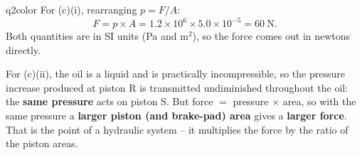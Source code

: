 \documentclass[11pt,a4paper]{article}
\begin{document}
\begin{ansbox}{q2color}
For (c)(i), rearranging $p = F/A$:
\[ F = p \times A = 1.2 \times 10^{6} \times 5.0 \times 10^{-5} = 60\ \mathrm{N}. \]
Both quantities are in SI units (Pa and $\mathrm{m^2}$), so the force comes out in newtons directly.

For (c)(ii), the oil is a liquid and is practically incompressible, so the pressure increase produced at piston R is transmitted undiminished throughout the oil: the \textbf{same pressure} acts on piston S. But force $= $ pressure $\times$ area, so with the same pressure a \textbf{larger piston (and brake-pad) area} gives a \textbf{larger force}. That is the point of a hydraulic system -- it multiplies the force by the ratio of the piston areas.
\end{ansbox}
\end{document}
